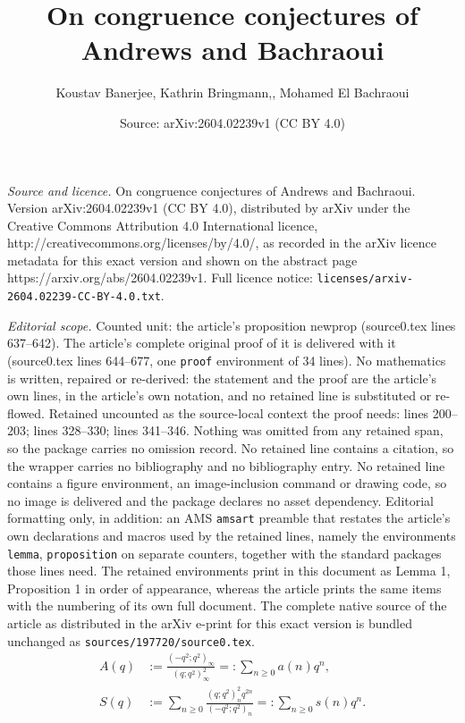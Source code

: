 \documentclass[10pt,a4paper]{amsart}
\title{On congruence conjectures of Andrews and Bachraoui}
\author{Koustav Banerjee, Kathrin Bringmann,, Mohamed El Bachraoui}
\date{Source: arXiv:2604.02239v1 (CC BY 4.0)}
\begin{document}
\maketitle

\noindent\emph{Source and licence.} On congruence conjectures of Andrews and Bachraoui. Version arXiv:2604.02239v1 (CC BY 4.0), distributed by arXiv under the Creative Commons Attribution 4.0 International licence, http://creativecommons.org/licenses/by/4.0/, as recorded in the arXiv licence metadata for this exact version and shown on the abstract page https://arxiv.org/abs/2604.02239v1. Full licence notice: \texttt{licenses/arxiv-2604.02239-CC-BY-4.0.txt}.\par\smallskip

\noindent\textit{Editorial scope.} Counted unit: the article's proposition newprop (source0.tex lines 637--642). The article's complete original proof of it is delivered with it (source0.tex lines 644--677, one \texttt{proof} environment of 34 lines). No mathematics is written, repaired or re-derived: the statement and the proof are the article's own lines, in the article's own notation, and no retained line is substituted or re-flowed.  Retained uncounted as the source-local context the proof needs: lines 200--203; lines 328--330; lines 341--346.  Nothing was omitted from any retained span, so the package carries no omission record.  No retained line contains a citation, so the wrapper carries no bibliography and no bibliography entry.  No retained line contains a figure environment, an image-inclusion command or drawing code, so no image is delivered and the package declares no asset dependency.  Editorial formatting only, in addition: an AMS \texttt{amsart} preamble that restates the article's own declarations and macros used by the retained lines, namely the environments \texttt{lemma}, \texttt{proposition} on separate counters, together with the standard packages those lines need.  The retained environments print in this document as Lemma 1, Proposition 1 in order of appearance, whereas the article prints the same items with the numbering of its own full document.  The complete native source of the article as distributed in the arXiv e-print for this exact version is bundled unchanged as \texttt{sources/197720/source0.tex}.
\begin{align}\label{A}
A(q)&:=\!\frac{\left(-q^2;q^2\right)_{\infty}}{\left(q;q^2\right)^2_{\infty}}\!=:\!\sum_{n\ge 0}a(n)q^n,\\\label{S}
 S(q)&:=\!\sum_{n\ge 0}\frac{\left(q;q^2\right)^2_n q^{2n}}{\left(-q^2;q^2\right)_n}\!=:\!\sum_{n\ge 0}s(n)q^n.
\end{align}
\end{document}
